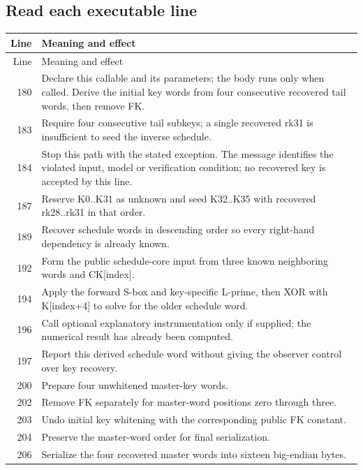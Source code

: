 \subsection*{Read each executable line}
\begingroup\small\begin{longtable}{r >{\raggedright\arraybackslash}p{138mm}}\toprule Line&Meaning and effect\\\midrule\endfirsthead\toprule Line&Meaning and effect\\\midrule\endhead
180&Declare this callable and its parameters; the body runs only when called. Derive the initial key words from four consecutive recovered tail words, then remove FK.\\
183&Require four consecutive tail subkeys; a single recovered rk31 is insufficient to seed the inverse schedule.\\
184&Stop this path with the stated exception. The message identifies the violated input, model or verification condition; no recovered key is accepted by this line.\\
187&Reserve K0..K31 as unknown and seed K32..K35 with recovered rk28..rk31 in that order.\\
189&Recover schedule words in descending order so every right-hand dependency is already known.\\
192&Form the public schedule-core input from three known neighboring words and CK[index].\\
194&Apply the forward S-box and key-specific L-prime, then XOR with K[index+4] to solve for the older schedule word.\\
196&Call optional explanatory instrumentation only if supplied; the numerical result has already been computed.\\
197&Report this derived schedule word without giving the observer control over key recovery.\\
200&Prepare four unwhitened master-key words.\\
202&Remove FK separately for master-word positions zero through three.\\
203&Undo initial key whitening with the corresponding public FK constant.\\
204&Preserve the master-word order for final serialization.\\
206&Serialize the four recovered master words into sixteen big-endian bytes.\\
\bottomrule\end{longtable}\endgroup

